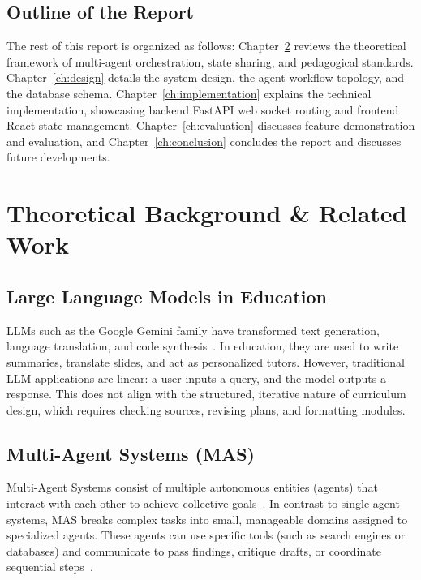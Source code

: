 \documentclass[12pt,a4paper]{report}
\begin{document}
\section{Outline of the Report}
The rest of this report is organized as follows: Chapter~\ref{ch:literature} reviews the theoretical framework of multi-agent orchestration, state sharing, and pedagogical standards. Chapter~\ref{ch:design} details the system design, the agent workflow topology, and the database schema. Chapter~\ref{ch:implementation} explains the technical implementation, showcasing backend FastAPI web socket routing and frontend React state management. Chapter~\ref{ch:evaluation} discusses feature demonstration and evaluation, and Chapter~\ref{ch:conclusion} concludes the report and discusses future developments.

\chapter{Theoretical Background \& Related Work}
\label{ch:literature}

\section{Large Language Models in Education}
LLMs such as the Google Gemini family have transformed text generation, language translation, and code synthesis~\cite{vaswani2017attention}. In education, they are used to write summaries, translate slides, and act as personalized tutors. However, traditional LLM applications are linear: a user inputs a query, and the model outputs a response. This does not align with the structured, iterative nature of curriculum design, which requires checking sources, revising plans, and formatting modules.

\section{Multi-Agent Systems (MAS)}
Multi-Agent Systems consist of multiple autonomous entities (agents) that interact with each other to achieve collective goals~\cite{wooldridge2009introduction}. In contrast to single-agent systems, MAS breaks complex tasks into small, manageable domains assigned to specialized agents. These agents can use specific tools (such as search engines or databases) and communicate to pass findings, critique drafts, or coordinate sequential steps~\cite{multiagentsystems2020}.
\end{document}
